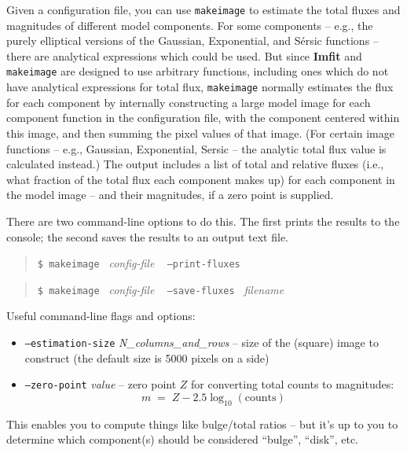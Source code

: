 \documentclass[10pt,a4paper,article]{memoir}
\newcommand{\imfit}{\textbf{Imfit}}
\newcommand{\makeimage}{\texttt{makeimage}}
\begin{document}
Given a configuration file, you can use \makeimage{} to estimate the
total fluxes and magnitudes of different model components. For some
components -- e.g., the purely elliptical versions of the Gaussian,
Exponential, and S\'{e}rsic functions -- there are analytical
expressions which could be used. But since \imfit{} and \makeimage{} are
designed to use arbitrary functions, including ones which do not have
analytical expressions for total flux, \makeimage{} normally estimates
the flux for each component by internally constructing a large model
image for each component function in the configuration file, with the
component centered within this image, and then summing the pixel values
of that image. (For certain image functions -- e.g., Gaussian,
Exponential, Sersic -- the analytic total flux value is calculated
instead.) The output includes a list of total and relative fluxes (i.e.,
what fraction of the total flux each component makes up) for each
component in the model image -- and their magnitudes, if a zero point is
supplied.

There are two command-line options to do this. The first prints the results
to the console; the second saves the results to an output text file.

\begin{quote}
  \texttt{\$ \makeimage{} }  \textit{config-file} ~ \texttt{--print-fluxes}
\end{quote}

\begin{quote}
  \texttt{\$ \makeimage{} }  \textit{config-file} ~ \texttt{--save-fluxes } \textit{filename}
\end{quote}

Useful command-line flags and options:
\begin{itemize}

\item \texttt{--estimation-size} \textit{N\_columns\_and\_rows} -- size of the
(square) image to construct (the default size is 5000 pixels on a side)

\item \texttt{--zero-point} \textit{value} -- zero point $Z$ for converting total counts
to magnitudes:
\begin{equation}
m \; = \; Z - 2.5 \log_{10}( {\mathrm{counts}} )
\end{equation}

\end{itemize}

This enables you to compute things like bulge/total ratios -- but it's up to you
to determine which component(s) should be considered ``bulge'', ``disk'', etc.
\end{document}
